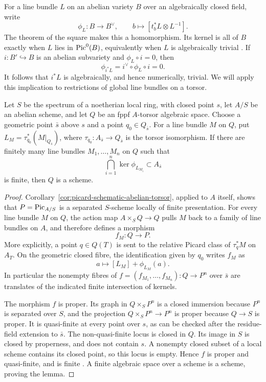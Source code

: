For a line bundle $L$ on an abelian variety $B$ over an algebraically
closed field, write
\[
 \phi_L:B\longrightarrow B^\vee,
 \qquad b\longmapsto[t_b^*L\otimes L^{-1}].
\]
The theorem of the square makes this a homomorphism. Its kernel is
all of $B$ exactly when $L$ lies in $\operatorname{Pic}^0(B)$, equivalently when
$L$ is algebraically trivial
\cite[Proposition~9.2, Remark~9.3 and Proposition~10.1,
pp.~14--17 of the author revision]{MilneAV}.
If $i:B'\hookrightarrow B$ is an abelian subvariety and
$\phi_L\circ i=0$, then
\[
 \phi_{i^*L}=i^\vee\circ\phi_L\circ i=0.
\]
It follows that $i^*L$ is algebraically, and hence numerically, trivial.
We will apply this implication to restrictions of global line
bundles on a torsor.

\begin{lemma}\label{lem:torsor-finite-translation-kernel}
Let $S$ be the spectrum of a noetherian local ring, with closed point
$s$, let $A/S$ be an abelian scheme, and let $Q$ be an fppf
$A$-torsor algebraic space. Choose a geometric point $\bar s$ above
$s$ and a point $q_0\in Q_{\bar s}$. For a line bundle $M$ on $Q$,
put $L_M=\tau_{q_0}^*(M|_{Q_{\bar s}})$, where
$\tau_{q_0}:A_{\bar s}\to Q_{\bar s}$ is the torsor isomorphism.
If there are finitely many line bundles $M_1,\ldots,M_n$ on $Q$ such
that
\[
 \bigcap_{i=1}^n\ker\phi_{L_{M_i}}\subset A_{\bar s}
\]
is finite, then $Q$ is a scheme.
\end{lemma}

\begin{proof}
Corollary~\ref{cor:picard-schematic-abelian-torsor}, applied to $A$
itself, shows that $P=\operatorname{Pic}_{A/S}$ is a separated $S$-scheme locally
of finite presentation. For every line bundle $M$ on $Q$, the action
map $A\times_S Q\to Q$ pulls $M$ back to a family of line bundles
on $A$, and therefore defines a morphism
\[
 f_M:Q\longrightarrow P.
\]
More explicitly, a point $q\in Q(T)$ is sent to the relative Picard
class of $\tau_q^*M$ on $A_T$. On the geometric closed fibre, the
identification given by $q_0$ writes $f_M$ as
\[
 a\longmapsto[L_M]+\phi_{L_M}(a).
\]
In particular the nonempty fibres of
$f=(f_{M_1},\ldots,f_{M_n}):Q\to P^n$ over $\bar s$ are translates
of the indicated finite intersection of kernels.

The morphism $f$ is proper. Its graph in $Q\times_S P^n$ is a closed
immersion because $P^n$ is separated over $S$, and the projection
$Q\times_S P^n\to P^n$ is proper because $Q\to S$ is proper.
It is quasi-finite at every point over $s$, as can be checked after
the residue-field extension to $\bar s$. The non-quasi-finite locus
is closed in $Q$. Its image in $S$ is closed by properness, and does
not contain $s$. A nonempty closed subset of a local scheme contains
its closed point, so this locus is empty. Hence $f$ is proper and
quasi-finite, and is finite \cite[Tag~0A4X]{Stacks}.
A finite algebraic space over a scheme is a scheme, proving the lemma.
\end{proof}

